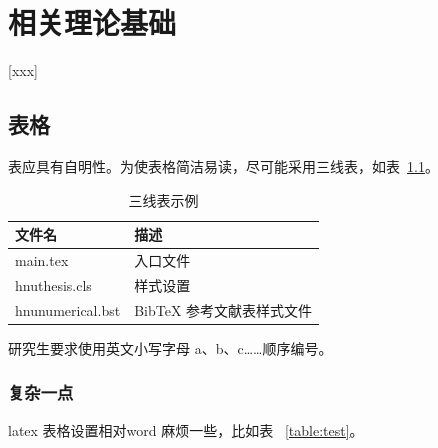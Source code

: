 \chapter{相关理论基础}
[xxx]

\section{表格}

表应具有自明性。为使表格简洁易读，尽可能采用三线表，如表~\ref{tab:three-line}。

\begin{table}[H]
  \centering
  \caption{三线表示例}
  \begin{tabular}{ll}
    \toprule
    文件名          & 描述                         \\
    \midrule
    main.tex  & 入口文件 \\
    hnuthesis.cls   & 样式设置                     \\
    hnunumerical.bst & BibTeX 参考文献表样式文件    \\
    \bottomrule
  \end{tabular}
  \label{tab:three-line}
\end{table}

研究生要求使用英文小写字母 a、b、c……顺序编号。

\subsection{复杂一点}
latex 表格设置相对word 麻烦一些，比如表 ~\ref{table:test}。

